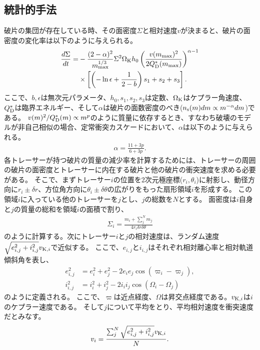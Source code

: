 \documentclass[a4paper,10pt,oneside,twocolumn,notitlepage,final]{jarticle}
\begin{document}
\subsection{統計的手法}
破片の集団が存在している時、その面密度$\Sigma$と相対速度$v$が決まると、破片の面密度の変化率は以下のように与えられる\citep{Kobayashi2010}。
\begin{align}
 \frac{d \Sigma}{d t} =& - \frac{(2 - \alpha)^2}{m_{\rm max}^{1/3}} \Sigma^2 \Omega_{\rm K} h_0 \left( \frac{v(m_{\rm max})^2}{2 Q_{\rm D}^{\ast}(m_{\rm max})} \right)^{\alpha - 1} \nonumber \\
 &\times \left[ \left( - \ln \epsilon + \frac{1}{2 - b} \right) s_1 + s_2 + s_3 \right]. \label{eq:tau}
\end{align}
ここで、$b,\epsilon$は無次元パラメータ、$h_0,s_1,s_2,s_3$は定数、$\Omega_{\rm K}$はケプラー角速度、$Q_{\rm D}^{\ast}$は臨界エネルギー、そして$\alpha$は破片の面数密度のべき($n_{\rm s} (m) dm \propto m^{- \alpha} dm$)である。
$v(m)^2/Q_{\rm D}^{\ast}(m) \propto m^p$のように質量に依存するとき、すなわち破壊のモデルが非自己相似の場合、定常衝突カスケードにおいて、$\alpha$は以下のように与えられる\citep{Kobayashi2010}。
\begin{align}
 \alpha = \frac{11 + 3p}{6 + 3p}.
\end{align}
各トレーサーが持つ破片の質量の減少率を計算するためには、トレーサーの周囲の破片の面密度とトレーサーに内在する破片と他の破片の衝突速度を求める必要がある。
そこで、まずトレーサー$i$の位置を2次元極座標($r_i,\theta_i$)に射影し、動径方向に$r_i \pm \delta r$、方位角方向に$\theta_i \pm \delta \theta$の広がりをもった扇形領域$i$を形成する。
この領域$i$に入っている他のトレーサーを$j$とし、$j$の総数を$N$とする。
面密度は$i$自身と$j$の質量の総和を領域$i$の面積で割り、
\begin{align}
 \Sigma_i = \frac{m_i + \sum_{j}^{N} m_j}{4 r_i \delta r \delta \theta}
\end{align}
のように計算する。次にトレーサー$i$と$j$の相対速度は、ランダム速度$\sqrt{e_{i,j}^2 + i_{i,j}^2} v_{{\rm K},i}$で近似する。
ここで、$e_{i,j}$と$i_{i,j}$はそれぞれ相対離心率と相対軌道傾斜角を表し、
\begin{align}
 e_{i,j}^2 &= e_i^2 + e_j^2 - 2 e_i e_j \cos(\varpi_i - \varpi_j),\\
 i_{i,j}^2 &= i_i^2 + i_j^2 - 2 i_i i_j \cos(\Omega_i - \Omega_j)
\end{align}
のように定義される。
ここで、$\varpi$は近点経度、$\Omega$は昇交点経度である。$v_{{\rm K},i}$は$i$のケプラー速度である。
そして$j$について平均をとり、平均相対速度を衝突速度だとみなす。
\begin{align}
 v_i = \frac{\sum_{j}^{N} \sqrt{e_{i,j}^2+i_{i,j}^2} v_{{\rm K},i}}{N}.
\end{align}
\end{document}
